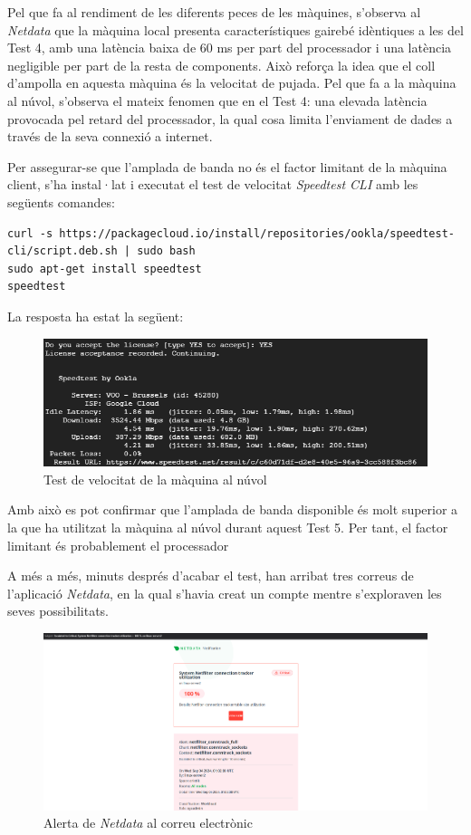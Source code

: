 Pel que fa al rendiment de les diferents peces de les màquines, s'observa al \textit{Netdata} que la màquina local presenta característiques gairebé idèntiques a les del Test 4, amb una latència baixa de 60 ms per part del processador i una latència negligible per part de la resta de components. Això reforça la idea que el coll d'ampolla en aquesta màquina és la velocitat de pujada. Pel que fa a la màquina al núvol, s'observa el mateix fenomen que en el Test 4: una elevada latència provocada pel retard del processador, la qual cosa limita l'enviament de dades a través de la seva connexió a internet.

Per assegurar-se que l'amplada de banda no és el factor limitant de la màquina client, s'ha instal·lat i executat el test de velocitat \textit{Speedtest CLI} amb les següents comandes: 
\begin{lstlisting} 
curl -s https://packagecloud.io/install/repositories/ookla/speedtest-cli/script.deb.sh | sudo bash 
sudo apt-get install speedtest 
speedtest 
\end{lstlisting} 
La resposta ha estat la següent:

\begin{figure}[!htbp] \includegraphics[width=1\textwidth]{Imatges/speedTest.png}
\caption{Test de velocitat de la màquina al núvol} \end{figure}

Amb això es pot confirmar que l'amplada de banda disponible és molt superior a la que ha utilitzat la màquina al núvol durant aquest Test 5. Per tant, el factor limitant és probablement el processador

A més a més, minuts després d'acabar el test, han arribat tres correus de l'aplicació \textit{Netdata}, en la qual s'havia creat un compte mentre s'exploraven les seves possibilitats.

\begin{figure}[!htbp] \includegraphics[width=1\textwidth]{Imatges/mail-netdata.png}
\caption{Alerta de \textit{Netdata} al correu electrònic} \end{figure}

